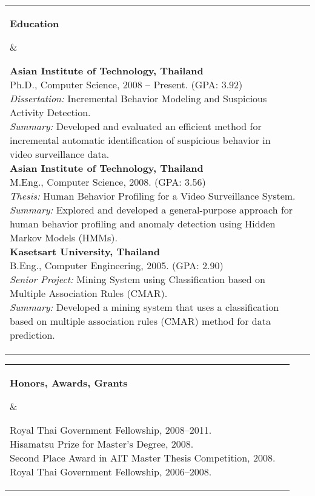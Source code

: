 \documentclass[11pt]{article}
\makeatletter
\newcommand{\mysection}[2]{
   \noindent
   \begin{tabular}{@{}ll@{}}
   \parbox[t]{1.0in}{ \raggedright \bf #1 } &
   \parbox[t]{5.0in}{ #2 }\\
   \hspace{0.2in}
   \end{tabular}
}
\makeatother
\begin{document}
\mysection{Education}{

{\bf Asian Institute of Technology, Thailand}\\
Ph.D., Computer Science, 2008 -- Present. (GPA: 3.92)\\
{\em Dissertation:} Incremental Behavior Modeling and Suspicious Activity 
Detection.\\
{\em Summary:} Developed and evaluated an efficient method for incremental automatic
identification of suspicious behavior in video surveillance data.\\

{\bf Asian Institute of Technology, Thailand}\\
M.Eng., Computer Science, 2008. (GPA: 3.56)\\
{\em Thesis:} Human Behavior Profiling for a Video Surveillance System.\\
{\em Summary:} Explored and developed a general-purpose approach for human behavior
profiling and anomaly detection using Hidden Markov Models (HMMs).\\

{\bf Kasetsart University, Thailand}\\
B.Eng., Computer Engineering, 2005. (GPA: 2.90)\\
{\em Senior Project:} Mining System using Classification based on 
Multiple Association Rules (CMAR).\\
{\em Summary:} Developed a mining system that uses a classification based on
multiple association rules (CMAR) method for data prediction.
}

\vspace{0.1in}

\mysection{Honors, Awards, Grants}{

Royal Thai Government Fellowship, 2008--2011.\\
Hisamatsu Prize for Master's Degree, 2008.\\
Second Place Award in AIT Master Thesis Competition, 2008.\\
Royal Thai Government Fellowship, 2006--2008.

}

\vspace{0.1in}
\end{document}
